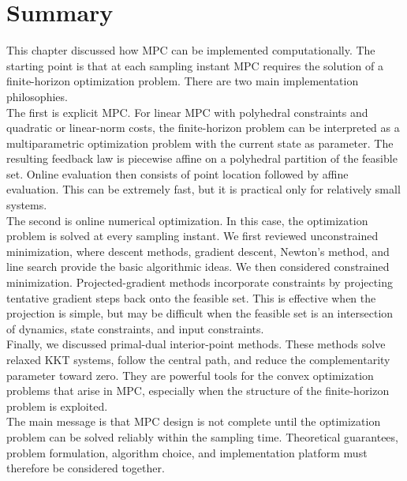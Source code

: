 \section{Summary}

This chapter discussed how MPC can be implemented computationally. The starting point is that
at each sampling instant MPC requires the solution of a finite-horizon optimization problem.
There are two main implementation philosophies.\\

The first is explicit MPC. For linear MPC with polyhedral constraints and quadratic or
linear-norm costs, the finite-horizon problem can be interpreted as a multiparametric
optimization problem with the current state as parameter. The resulting feedback law is
piecewise affine on a polyhedral partition of the feasible set. Online evaluation then consists of
point location followed by affine evaluation. This can be extremely fast, but it is practical only
for relatively small systems.\\
The second is online numerical optimization. In this case, the optimization problem is solved at
every sampling instant. We first reviewed unconstrained minimization, where descent methods,
gradient descent, Newton's method, and line search provide the basic algorithmic ideas. We then
considered constrained minimization. Projected-gradient methods incorporate constraints by
projecting tentative gradient steps back onto the feasible set. This is effective when the
projection is simple, but may be difficult when the feasible set is an intersection of dynamics,
state constraints, and input constraints.\\
Finally, we discussed primal-dual interior-point methods. These methods solve relaxed KKT
systems, follow the central path, and reduce the complementarity parameter toward zero. They
are powerful tools for the convex optimization problems that arise in MPC, especially when the
structure of the finite-horizon problem is exploited.\\

The main message is that MPC design is not complete until the optimization problem can be
solved reliably within the sampling time. Theoretical guarantees, problem formulation,
algorithm choice, and implementation platform must therefore be considered together.